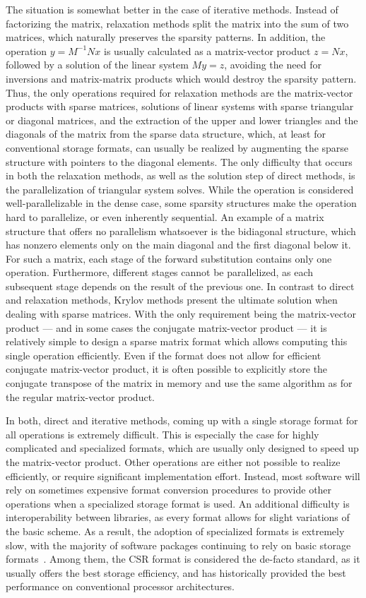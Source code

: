 The situation is somewhat better in the case of iterative methods. Instead of
factorizing the matrix, relaxation methods split the matrix into the sum of two
matrices, which naturally preserves the sparsity patterns. In addition, the
operation $y = M^{-1}Nx$ is usually calculated as a matrix-vector product $z =
Nx$, followed by a solution of the linear system $My = z$, avoiding the need for
inversions and matrix-matrix products which would destroy the sparsity pattern.
Thus, the only operations required for relaxation methods are the matrix-vector
products with sparse matrices, solutions of linear systems with sparse
triangular or diagonal matrices, and the extraction of the upper and lower
triangles and the diagonals of the matrix from the sparse data structure, which,
at least for conventional storage formats, can usually be realized by augmenting
the sparse structure with pointers to the diagonal elements. The only difficulty
that occurs in both the relaxation methods, as well as the solution step of
direct methods, is the parallelization of triangular system solves. While the
operation is considered well-parallelizable in the dense case, some sparsity
structures make the operation hard to parallelize, or even inherently
sequential. An example of a matrix structure that offers no parallelism
whatsoever is the bidiagonal structure, which has nonzero elements only on the
main diagonal and the first diagonal below it. For such a matrix, each stage of
the forward substitution contains only one operation. Furthermore, different
stages cannot be parallelized, as each subsequent stage depends on the result of
the previous one.
In contrast to direct and relaxation methods, Krylov methods present the
ultimate solution when dealing with sparse matrices.  With the only requirement
being the matrix-vector product --- and in some cases the conjugate
matrix-vector product --- it is relatively simple to design a sparse matrix
format which allows computing this single operation efficiently. Even if the
format does not allow for efficient conjugate matrix-vector product, it is often
possible to explicitly store the conjugate transpose of the matrix in memory and
use the same algorithm as for the regular matrix-vector product.

In both, direct and iterative methods, coming up with a single storage format for
all operations is extremely difficult. This is especially the case for highly
complicated and specialized formats, which are usually only designed to speed up
the matrix-vector product. Other operations are either not possible to realize
efficiently, or require significant implementation effort. Instead, most
software will rely on sometimes expensive format conversion procedures to
provide other operations when a specialized storage format is used. An
additional difficulty is interoperability between libraries, as every format
allows for slight variations of the basic scheme. As a result, the adoption of
specialized formats is extremely slow, with the majority of software packages
continuing to rely on basic storage
formats~\cite{ginkgo,paralution,vienna-cl,magma}. Among them, the CSR format is
considered the de-facto standard, as it usually offers the best storage
efficiency, and has historically provided the best performance on conventional
processor architectures.
